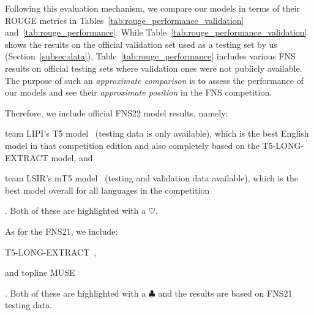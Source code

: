 Following this evaluation mechanism, we compare our models in terms of their ROUGE metrics in Tables~\ref{tab:rouge_performance_validation} and~\ref{tab:rouge_performance}.
While Table~\ref{tab:rouge_performance_validation} shows the results on the official validation set used as a testing set by us (Section~\ref{subsec:data}),
Table~\ref{tab:rouge_performance} includes various FNS results on official testing sets where validation ones were not publicly available.
The purpose of such an \emph{approximate comparison} is to assess the performance of our models and see their \emph{approximate position} in the FNS competition.


Therefore, we include official FNS22 model results, namely:
\begin{enumerate*}
    \item team LIPI's T5 model~\cite{el-haj-etal-2022-financial} (testing data is only available), which is the best English model
          in that competition edition and also completely based on the T5-LONG-EXTRACT model, and
    \item team LSIR's mT5 model~\cite{foroutan-etal-2022-multilingual} (testing and validation data available), which is the best model overall for all languages in the competition
\end{enumerate*}. Both of these are highlighted with a $\heartsuit$.

As for the FNS21, we include:
\begin{enumerate*}
    \item T5-LONG-EXTRACT~\cite{orzhenovskii-2021-t5},
    \item and topline MUSE~\cite{litvak-last-2013-multilingual}
\end{enumerate*}. Both of these are highlighted with a $\clubsuit$ and the results are based on FNS21 testing data.


